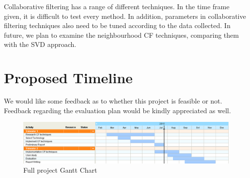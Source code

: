 Collaborative filtering has a range of different techniques. In the time frame given, it is difficult to test every method. In addition, parameters in collaborative filtering techniques also need to be tuned according to the data collected. In future, we plan to examine the neighbourhood CF techniques, comparing them with the SVD approach.

\section{Proposed Timeline}

We would like some feedback as to whether this project is feasible or not. Feedback regarding the evaluation plan would be kindly appreciated as well. 

\begin{figure}
\centering
\includegraphics[scale=0.62]{images/gantt}
\caption{Full project Gantt Chart}
\label{fig:my_label}
\end{figure}

